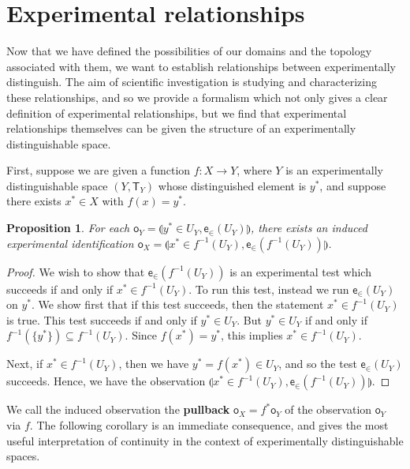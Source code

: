 \documentclass[review]{elsarticle}
\theoremstyle{plain}%
\newtheorem{prop}[thm]{Proposition}
\theoremstyle{definition}
\theoremstyle{remark}
\begin{document}
\section{Experimental relationships}

Now that we have defined the possibilities of our domains and the topology associated with them, we want to establish relationships between experimentally distinguish. The aim of scientific investigation is studying and characterizing these relationships, and so we provide a formalism which not only gives a clear definition of experimental relationships, but we find that experimental relationships themselves can be given the structure of an experimentally distinguishable space. 

First, suppose we are given a function $f:X\to Y$, where $Y$ is an experimentally distinguishable space $(Y,\mathsf{T}_Y)$ whose distinguished element is $y^*$, and suppose there exists $x^*\in X$ with $f(x)=y^*$. 

\begin{prop}
For each $\mathsf{o}_Y = \llparenthesis y^*\in U_Y,\mathsf{e}_{\in}(U_Y)\rrparenthesis$, there exists an induced experimental identification $\mathsf{o}_X = \llparenthesis x^*\in f^{-1}(U_Y), \mathsf{e}_{\in}(f^{-1}(U_Y)) \rrparenthesis$.
\end{prop}
\begin{proof}
We wish to show that $\mathsf{e}_{\in}(f^{-1}(U_Y))$ is an experimental test which succeeds if and only if $x^*\in f^{-1}(U_Y)$. To run this test, instead we run $\mathsf{e}_{\in}(U_Y)$ on $y^*$. We show first that if this test succeeds, then the statement $x^*\in f^{-1}(U_Y)$ is true. This test succeeds if and only if $y^*\in U_Y$. But $y^* \in U_Y$ if and only if $f^{-1}(\{y^*\})\subseteq f^{-1}(U_Y)$. Since $f(x^*)=y^*$, this implies $x^*\in f^{-1}(U_Y)$. 

Next, if $x^*\in f^{-1}(U_Y)$, then we have $y^*=f(x^*) \in U_Y$, and so the test $\mathsf{e}_{\in}(U_Y)$ succeeds. Hence, we have the observation $\llparenthesis x^*\in f^{-1}(U_Y), \mathsf{e}_{\in}(f^{-1}(U_Y))\rrparenthesis$. 

\end{proof}

We call the induced observation the \textbf{pullback} $\mathsf{o}_X = f^*\mathsf{o}_Y$ of the observation $\mathsf{o}_Y$ via $f$. The following corollary is an immediate consequence, and gives the most useful interpretation of continuity in the context of experimentally distinguishable spaces. 
\end{document}
